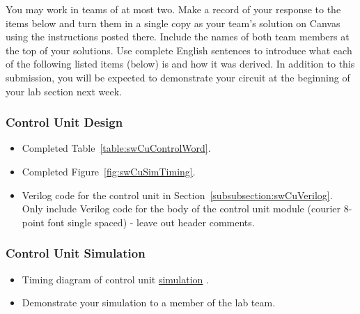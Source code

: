 You may work in teams of at most two. Make a record of your response to
the items below and turn them in a single copy as your team's solution
on Canvas using the instructions posted there. Include the names of both
team members at the top of your solutions. Use complete English
sentences to introduce what each of the following listed items (below)
is and how it was derived. In addition to this submission, you will be
expected to demonstrate your circuit at the beginning of your lab
section next week.

\subsubsection{Control Unit Design}

\begin{itemize}
\item
  Completed Table~\ref{table:swCuControlWord}.
\item
  Completed Figure~\ref{fig:swCuSimTiming}.
\item
  Verilog code for the control unit in Section~\ref{subsubsection:swCuVerilog}.  Only
  include Verilog code for the body of the control unit module (courier 8-point
  font single spaced) - leave out header comments.
\end{itemize}

\subsubsection{Control Unit Simulation}

\begin{itemize}
\item
 Timing diagram of control unit \hyperlink{swCuWaveform}{simulation} .
\end{itemize}

\begin{itemize}
\item
  Demonstrate your simulation to a member of the lab team.
\end{itemize}

